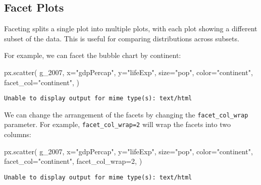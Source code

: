 \documentclass[
  letterpaper,
  DIV=11,
  numbers=noendperiod]{scrreprt}
\newenvironment{Shaded}{\begin{snugshade}}{\end{snugshade}}
\newcommand{\DecValTok}[1]{\textcolor[rgb]{0.68,0.00,0.00}{#1}}
\newcommand{\NormalTok}[1]{\textcolor[rgb]{0.00,0.23,0.31}{#1}}
\newcommand{\OperatorTok}[1]{\textcolor[rgb]{0.37,0.37,0.37}{#1}}
\newcommand{\StringTok}[1]{\textcolor[rgb]{0.13,0.47,0.30}{#1}}
\begin{document}
\subsection{Facet Plots}\label{facet-plots}

Faceting splits a single plot into multiple plots, with each plot
showing a different subset of the data. This is useful for comparing
distributions across subsets.

For example, we can facet the bubble chart by continent:

\begin{Shaded}
\begin{Highlighting}[]
\NormalTok{px.scatter(}
\NormalTok{    g\_2007,}
\NormalTok{    x}\OperatorTok{=}\StringTok{"gdpPercap"}\NormalTok{,}
\NormalTok{    y}\OperatorTok{=}\StringTok{"lifeExp"}\NormalTok{,}
\NormalTok{    size}\OperatorTok{=}\StringTok{"pop"}\NormalTok{,}
\NormalTok{    color}\OperatorTok{=}\StringTok{"continent"}\NormalTok{,}
\NormalTok{    facet\_col}\OperatorTok{=}\StringTok{"continent"}\NormalTok{,}
\NormalTok{)}
\end{Highlighting}
\end{Shaded}

\begin{verbatim}
Unable to display output for mime type(s): text/html
\end{verbatim}

We can change the arrangement of the facets by changing the
\texttt{facet\_col\_wrap} parameter. For example,
\texttt{facet\_col\_wrap=2} will wrap the facets into two columns:

\begin{Shaded}
\begin{Highlighting}[]
\NormalTok{px.scatter(}
\NormalTok{    g\_2007,}
\NormalTok{    x}\OperatorTok{=}\StringTok{"gdpPercap"}\NormalTok{,}
\NormalTok{    y}\OperatorTok{=}\StringTok{"lifeExp"}\NormalTok{,}
\NormalTok{    size}\OperatorTok{=}\StringTok{"pop"}\NormalTok{,}
\NormalTok{    color}\OperatorTok{=}\StringTok{"continent"}\NormalTok{,}
\NormalTok{    facet\_col}\OperatorTok{=}\StringTok{"continent"}\NormalTok{,}
\NormalTok{    facet\_col\_wrap}\OperatorTok{=}\DecValTok{2}\NormalTok{,}
\NormalTok{)}
\end{Highlighting}
\end{Shaded}

\begin{verbatim}
Unable to display output for mime type(s): text/html
\end{verbatim}
\end{document}
